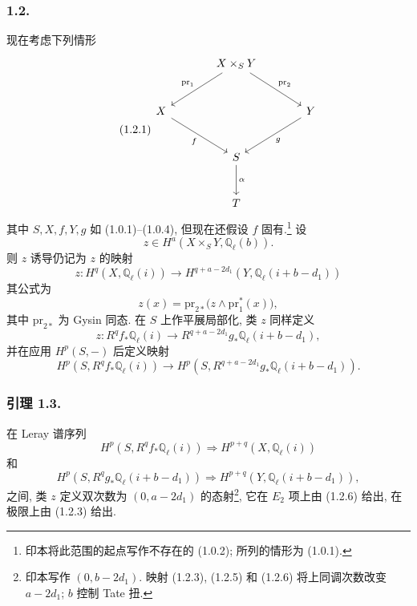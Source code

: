 \subsubsection*{1.2.}
现在考虑下列情形
\begin{equation}\tag{1.2.1}
\begin{tikzcd}[column sep=large, row sep=large]
{} & X\times_S Y \arrow[dl, "\mathrm{pr}_1"']
                  \arrow[dr, "\mathrm{pr}_2"] & {} \\
X \arrow[dr, "f"'] & {} & Y \arrow[dl, "g"] \\
{} & S \arrow[d, "\alpha"] & {} \\
{} & T & {}
\end{tikzcd}
\end{equation}
其中 $S,X,f,Y,g$ 如 (1.0.1)--(1.0.4), 但现在还假设 $f$ 固有.\footnote{印本将此范围的起点写作不存在的 (1.0.2); 所列的情形为 (1.0.1).} 设
\begin{equation}\tag{1.2.2}
z\in H^a(X\times_S Y,\mathbb Q_\ell(b)).
\end{equation}
则 $z$ 诱导仍记为 $z$ 的映射
\begin{equation}\tag{1.2.3}
z:H^q(X,\mathbb Q_\ell(i))\longrightarrow
H^{q+a-2d_1}(Y,\mathbb Q_\ell(i+b-d_1))
\end{equation}
其公式为
\begin{equation}\tag{1.2.4}
z(x)=\mathrm{pr}_{2*}\bigl(z\wedge\mathrm{pr}_1^*(x)\bigr),
\end{equation}
其中 $\mathrm{pr}_{2*}$ 为 Gysin 同态. 在 $S$ 上作平展局部化, 类 $z$ 同样定义
\begin{equation}\tag{1.2.5}
z:R^qf_*\mathbb Q_\ell(i)\longrightarrow
R^{q+a-2d_1}g_*\mathbb Q_\ell(i+b-d_1),
\end{equation}
并在应用 $H^p(S,-)$ 后定义映射
\begin{equation}\tag{1.2.6}
H^p(S,R^qf_*\mathbb Q_\ell(i))\longrightarrow
H^p(S,R^{q+a-2d_1}g_*\mathbb Q_\ell(i+b-d_1)).
\end{equation}

\subsubsection*{引理 1.3.}
在 Leray 谱序列
\begin{equation}\tag{1.2.7}
H^p(S,R^qf_*\mathbb Q_\ell(i))\Longrightarrow
H^{p+q}(X,\mathbb Q_\ell(i))
\end{equation}
和
\begin{equation}\tag{1.2.8}
H^p(S,R^qg_*\mathbb Q_\ell(i+b-d_1))\Longrightarrow
H^{p+q}(Y,\mathbb Q_\ell(i+b-d_1)),
\end{equation}
之间, 类 $z$ 定义双次数为 $(0,a-2d_1)$ 的态射\footnote{印本写作 $(0,b-2d_1)$. 映射 (1.2.3), (1.2.5) 和 (1.2.6) 将上同调次数改变 $a-2d_1$; $b$ 控制 Tate 扭.}, 它在 $E_2$ 项上由 (1.2.6) 给出, 在极限上由 (1.2.3) 给出.

